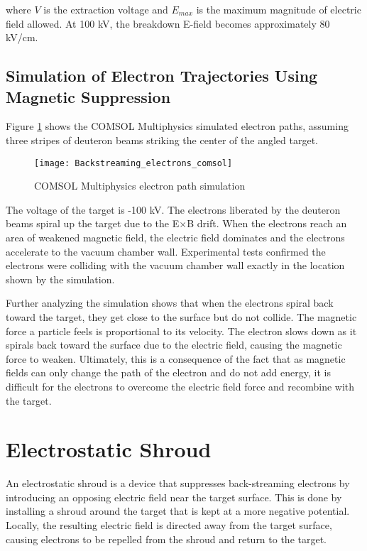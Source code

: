 \documentclass[aps,prstab,twocolumn,superscriptaddress]{revtex4-1}
\begin{document}
where $V$ is the extraction voltage and $E_{max}$ is the maximum magnitude of electric field allowed. At 100 kV, the breakdown E-field becomes approximately 80 kV/cm.

\subsection{Simulation of Electron Trajectories Using Magnetic Suppression}

Figure \ref{fig:comsol_electrons} shows the COMSOL Multiphysics\textsuperscript{\textregistered} simulated electron paths, assuming three stripes of deuteron beams striking the center of the angled target.

\begin{figure}
	\centering
	\texttt{[image: Backstreaming\_electrons\_comsol]}
	\caption{COMSOL Multiphysics\textsuperscript{\textregistered} electron path simulation}
	\label{fig:comsol_electrons}
\end{figure}

The voltage of the target is -100 kV. The electrons liberated by the deuteron beams spiral up the target due to the E$\times$B drift.  When the electrons reach an area of weakened magnetic field, the electric field dominates and the electrons accelerate to the vacuum chamber wall. Experimental tests confirmed the electrons were colliding with the vacuum chamber wall exactly in the location shown by the simulation. 

Further analyzing the simulation shows that when the electrons spiral back toward the target, they get close to the surface but do not collide. The magnetic force a particle feels is proportional to its velocity. The electron slows down as it spirals back toward the surface due to the electric field, causing the magnetic force to weaken. Ultimately, this is a consequence of the fact that as magnetic fields can only change the path of the electron and do not add energy, it is difficult for the electrons to overcome the electric field force and recombine with the target.  

\section{Electrostatic Shroud}
An electrostatic shroud  is a device that suppresses back-streaming electrons by introducing an opposing electric field near the target surface. This is done by installing a shroud around the target that is kept at a more negative potential. Locally, the resulting electric field is directed away from the target surface, causing electrons to be repelled from the shroud and return to the target.
\end{document}
